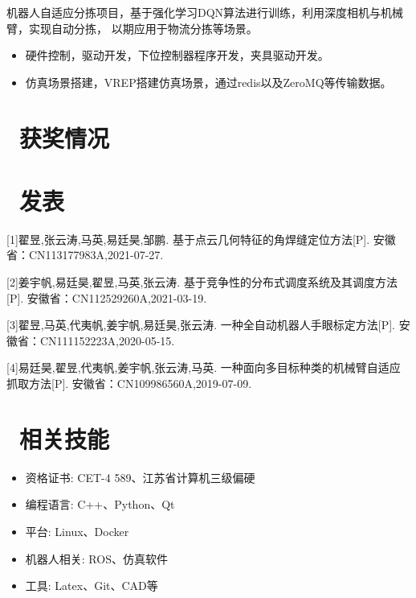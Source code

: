 \documentclass{resume}
\begin{document}
\begin{onehalfspacing}
机器人自适应分拣项目，基于强化学习DQN算法进行训练，利用深度相机与机械臂，实现自动分拣，
以期应用于物流分拣等场景。
  \begin{itemize}
  \item 硬件控制，驱动开发，下位控制器程序开发，夹具驱动开发。
  \item 仿真场景搭建，VREP搭建仿真场景，通过redis以及ZeroMQ等传输数据。
\end{itemize}
\end{onehalfspacing}



\section{\faHeartO\ 获奖情况}

\section{\faPencil\ 发表}
[1]翟昱,张云涛,马英,易廷昊,邹鹏. 基于点云几何特征的角焊缝定位方法[P]. 安徽省：CN113177983A,2021-07-27.  

[2]姜宇帆,易廷昊,翟昱,马英,张云涛. 基于竞争性的分布式调度系统及其调度方法[P]. 安徽省：CN112529260A,2021-03-19. 

[3]翟昱,马英,代夷帆,姜宇帆,易廷昊,张云涛. 一种全自动机器人手眼标定方法[P]. 安徽省：CN111152223A,2020-05-15. 

[4]易廷昊,翟昱,代夷帆,姜宇帆,张云涛,马英. 一种面向多目标种类的机械臂自适应抓取方法[P]. 安徽省：CN109986560A,2019-07-09. 


\section{\faCogs\ 相关技能}
\begin{itemize}[parsep=0.5ex]
  \item 资格证书: CET-4 589、江苏省计算机三级偏硬
  \item 编程语言: C++、Python、Qt 
  \item 平台: Linux、Docker
  \item 机器人相关: ROS、仿真软件
  \item 工具: Latex、Git、CAD等  
\end{itemize}
\end{document}
